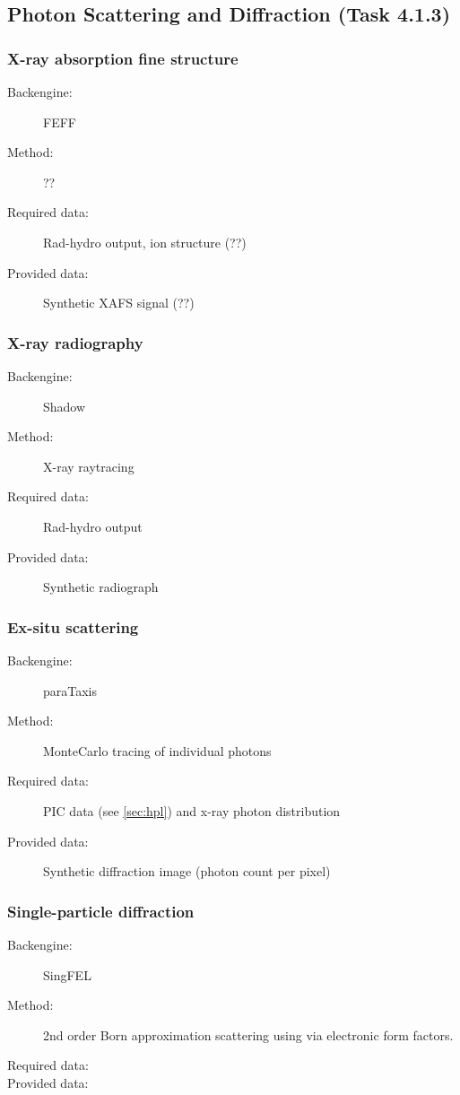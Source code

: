 \documentclass[12pt]{scrartcl}
\begin{document}
\subsection{Photon Scattering and Diffraction (Task 4.1.3)}

\subsubsection{X-ray absorption fine structure}
\begin{description}
  \item[Backengine:] FEFF
  \item[Method:] ??
  \item[Required data:] Rad-hydro output, ion structure (??)
  \item[Provided data:] Synthetic XAFS signal (??)
\end{description}

\subsubsection{X-ray radiography}
\begin{description}
  \item[Backengine:] Shadow \cite{}
  \item[Method:] X-ray raytracing
  \item[Required data:] Rad-hydro output
  \item[Provided data:] Synthetic radiograph
\end{description}
\subsubsection{Ex-situ scattering}
\begin{description}
  \item[Backengine:] paraTaxis \cite{paraTaxis_github}
  \item[Method:] MonteCarlo tracing of individual photons
  \item[Required data:] PIC data (see \ref{sec:hpl}) and x-ray photon distribution
  \item[Provided data:] Synthetic diffraction image (photon count per pixel)
\end{description}

\subsubsection{Single-particle diffraction}
\begin{description}
  \item[Backengine:] SingFEL
  \item[Method:] 2nd order Born approximation scattering using via electronic form factors.
  \item[Required data:]
  \item[Provided data:]
\end{description}
%
\end{document}
